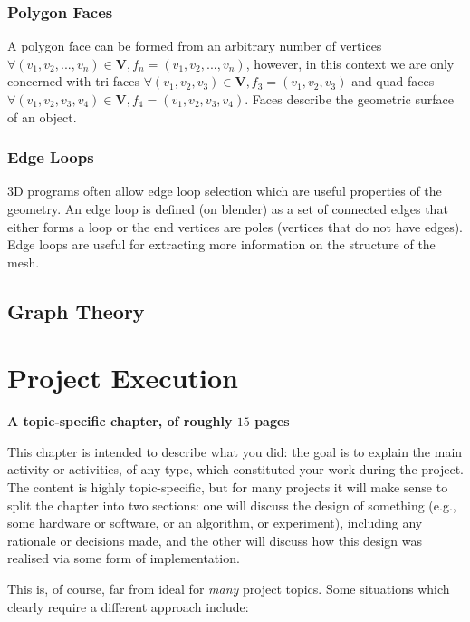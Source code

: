 \documentclass[ %
                    author={Dillon Keith Diep},
                supervisor={Dr. Carl Henrik Ek},
                    degree={MEng},
                     title={Assisted Content Generation for 3D Hair Geometry},
                  subtitle={[INCOMPLETE DRAFT, NOT FOR SUBMISSION]},
                      type={Research},
                      year={2014} ]{dissertation}
\begin{document}
\subsection{Polygon Faces}
A polygon face can be formed from an arbitrary number of vertices $\forall (v_1, v_2,...,v_n) \in \mathbf{V}, f_n = (v_1, v_2,..., v_n)$, however, in this context we are only concerned with tri-faces $\forall (v_1, v_2, v_3) \in \mathbf{V}, f_3 = (v_1, v_2, v_3)$ and quad-faces $\forall (v_1, v_2, v_3, v_4) \in \mathbf{V}, f_4 = (v_1, v_2, v_3, v_4)$. Faces describe the geometric surface of an object. 

\subsection{Edge Loops}
3D programs often allow edge loop selection which are useful properties of the geometry. An edge loop is defined (on blender) as a set of connected edges that either forms a loop or the end vertices are poles (vertices that do not have edges). Edge loops are useful for extracting more information on the structure of the mesh.
\cite{edgeloops}

\section{Graph Theory}




\chapter{Project Execution}
\label{chap:execution}

{\bf A topic-specific chapter, of roughly $15$ pages} 
\vspace{1cm} 

\noindent
This chapter is intended to describe what you did: the goal is to explain
the main activity or activities, of any type, which constituted your work 
during the project.  The content is highly topic-specific, but for many 
projects it will make sense to split the chapter into two sections: one 
will discuss the design of something (e.g., some hardware or software, or 
an algorithm, or experiment), including any rationale or decisions made, 
and the other will discuss how this design was realised via some form of 
implementation.  

This is, of course, far from ideal for {\em many} project topics.  Some
situations which clearly require a different approach include:
\end{document}
